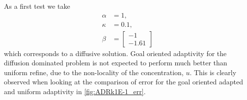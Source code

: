 \begin{test}[Diffusion Dominated ARD, $\kappa = 0.1$] \label{tst:ADRk1E-1}
    As a first test we take
    \begin{align*}
        \alpha &= 1, \\
        \kappa &= 0.1, \\
        \beta &= \begin{bmatrix} -1 \\ -1.61 \end{bmatrix}
    \end{align*}
    which corresponds to a diffusive solution. Goal oriented adaptivity for
    the diffusion dominated problem is not expected to perform much better than
    uniform refine, due to the non-locality of the concentration, $u$. This is
    clearly observed when looking at the comparison of error for the goal
    oriented adapted and uniform adaptivity in \autoref{fig:ADRk1E-1_err}.
    \begin{figure}[h]
        \centering
        \begin{minipage}[t]{0.49\textwidth}
            \centering
\end{minipage}
\end{figure}
\end{test}
